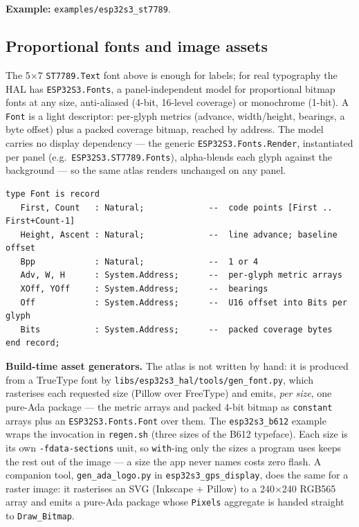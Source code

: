 \noindent\textbf{Example:} \texttt{examples/esp32s3\_st7789}.

\subsection{Proportional fonts and image assets}\label{app:ext:fonts}

The 5$\times$7 \texttt{ST7789.Text} font above is enough for labels; for real
typography the HAL has \texttt{ESP32S3.Fonts}, a panel-independent model for
proportional bitmap fonts at any size, anti-aliased (4-bit, 16-level coverage) or
monochrome (1-bit). A \texttt{Font} is a light descriptor: per-glyph metrics
(advance, width/height, bearings, a byte offset) plus a packed coverage bitmap,
reached by address. The model carries no display dependency --- the generic
\texttt{ESP32S3.Fonts.Render}, instantiated per panel (e.g.\
\texttt{ESP32S3.ST7789.Fonts}), alpha-blends each glyph against the background ---
so the same atlas renders unchanged on any panel.

\begin{lstlisting}
type Font is record
   First, Count   : Natural;             --  code points [First .. First+Count-1]
   Height, Ascent : Natural;             --  line advance; baseline offset
   Bpp            : Natural;             --  1 or 4
   Adv, W, H      : System.Address;      --  per-glyph metric arrays
   XOff, YOff     : System.Address;      --  bearings
   Off            : System.Address;      --  U16 offset into Bits per glyph
   Bits           : System.Address;      --  packed coverage bytes
end record;
\end{lstlisting}

\noindent\textbf{Build-time asset generators.} The atlas is not written by hand:
it is produced from a TrueType font by \texttt{libs/esp32s3\_hal/tools/gen\_font.py},
which rasterises each requested size (Pillow over FreeType) and emits, \emph{per
size}, one pure-Ada package --- the metric arrays and packed 4-bit bitmap as
\texttt{constant} arrays plus an \texttt{ESP32S3.Fonts.Font} over them. The
\texttt{esp32s3\_b612} example wraps the invocation in \texttt{regen.sh} (three
sizes of the B612 typeface). Each size is its own \texttt{-fdata-sections} unit, so
\texttt{with}-ing only the sizes a program uses keeps the rest out of the image ---
a size the app never names costs zero flash. A companion tool,
\texttt{gen\_ada\_logo.py} in \texttt{esp32s3\_gps\_display}, does the same for a
raster image: it rasterises an SVG (Inkscape + Pillow) to a 240$\times$240 RGB565
array and emits a pure-Ada package whose \texttt{Pixels} aggregate is handed
straight to \texttt{Draw\_Bitmap}.

